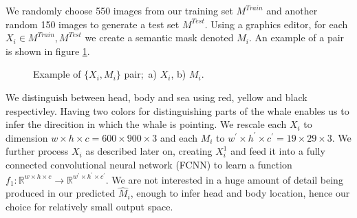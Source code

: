 \documentclass{IET}%
\newcommand{\real}{\mathbb{R}}
\begin{document}
We randomly choose 550 images from our training set $M^{Train}$ and another random 150 images to generate a test set $M^{Test}$. Using a graphics editor, for each $X_i \in {M^{Train}, M^{Test}}$ we create a semantic mask denoted $M_i$. An example of a pair is shown in figure \ref{fig:whaleLabel}.
\begin{figure}[H]
\centering     %
{}
\caption{Example of $\{X_i,M_i\}$ pair;\
a) $X_i$, b) $M_i$.
}\label{fig:whaleLabel}
\end{figure}
We distinguish between head, body and sea using red, yellow and black respectivley. Having two colors for distinguishing parts of the whale enables us to infer the direcition in which the whale is pointing. We rescale each $X_i$ to dimension $w \times h \times c = 600 \times 900 \times 3$ and each $M_i$ to $w^{'}\times h^{'}\times c^{'} = 19 \times 29 \times 3$. We further process $X_i$ as described later on, creating $X_i^1$ and feed it into a fully connected convolutional neural network (FCNN) to learn a function $f_1: \real^{w\times h \times c} \to \real^{w^{'}\times h^{'}\times c^{'}}$. We are not interested in a huge amount of detail being produced in our predicted $\hat{M}_i$, enough to infer head and body location, hence our choice for relatively small output space.
\end{document}
